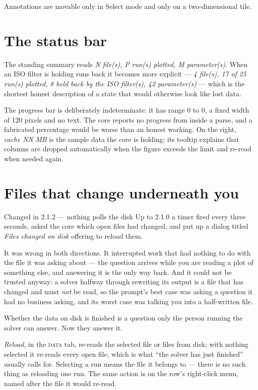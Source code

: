 \documentclass[11pt,a4paper,oneside]{report}
\newcommand{\appver}{2.1.2}
\newcommand{\tab}[1]{\textsc{#1}}
\begin{document}
Annotations are movable only in Select mode and only on a two-dimensional tile.

\section{The status bar}

The standing summary reads \emph{N file(s), P run(s) plotted, M parameter(s)}.
When an ISO filter is holding runs back it becomes more explicit ---
\emph{4 file(s), 17 of 25 run(s) plotted, 8 held back by the ISO filter(s), 42
parameter(s)} --- which is the shortest honest description of a state that would
otherwise look like lost data.

The progress bar is deliberately indeterminate: it has range 0 to 0, a fixed
width of 120 pixels and no text. The core reports no progress from inside a
parse, and a fabricated percentage would be worse than an honest working. On the
right, \emph{cache NN MB} is the sample data the core is holding; its tooltip
explains that columns are dropped automatically when the figure exceeds the
limit and re-read when needed again.

\section{Files that change underneath you}
\label{sec:reload}

\begin{aoenew}{Changed in \appver{} --- nothing polls the disk}
Up to 2.1.0 a timer fired every three seconds, asked the core which open files
had changed, and put up a dialog titled \emph{Files changed on disk} offering
to reload them.

It was wrong in both directions. It interrupted work that had nothing to do
with the file it was asking about --- the question arrives while you are
reading a plot of something else, and answering it is the only way back. And it
could not be trusted anyway: a solver halfway through rewriting its output is a
file that has changed and must \emph{not} be read, so the prompt's best case
was asking a question it had no business asking, and its worst case was talking
you into a half-written file.

Whether the data on disk is finished is a question only the person running the
solver can answer. Now they answer it.
\end{aoenew}

\emph{Reload}, in the \tab{data} tab, re-reads the selected file or files from
disk; with nothing selected it re-reads every open file, which is what ``the
solver has just finished'' usually calls for. Selecting a run means the file it
belongs to --- there is no such thing as reloading one run. The same action is
on the row's right-click menu, named after the file it would re-read.
\end{document}
